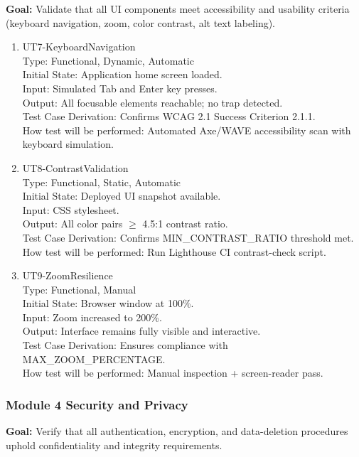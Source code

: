 \documentclass[12pt, titlepage]{article}
\begin{document}
\textbf{Goal:} Validate that all UI components meet accessibility and usability criteria (keyboard navigation, zoom, color contrast, alt text labeling).

\begin{enumerate}
\item{UT7-KeyboardNavigation\\}
Type: Functional, Dynamic, Automatic\\
Initial State: Application home screen loaded.\\
Input: Simulated Tab and Enter key presses.\\
Output: All focusable elements reachable; no trap detected.\\
Test Case Derivation: Confirms WCAG 2.1 Success Criterion 2.1.1.\\
How test will be performed: Automated Axe/WAVE accessibility scan with keyboard simulation.

\item{UT8-ContrastValidation\\}
Type: Functional, Static, Automatic\\
Initial State: Deployed UI snapshot available.\\
Input: CSS stylesheet.\\
Output: All color pairs $\geq$ 4.5:1 contrast ratio.\\
Test Case Derivation: Confirms MIN\_CONTRAST\_RATIO threshold met.\\
How test will be performed: Run Lighthouse CI contrast-check script.

\item{UT9-ZoomResilience\\}
Type: Functional, Manual\\
Initial State: Browser window at 100\%.\\
Input: Zoom increased to 200\%.\\
Output: Interface remains fully visible and interactive.\\
Test Case Derivation: Ensures compliance with MAX\_ZOOM\_PERCENTAGE.\\
How test will be performed: Manual inspection + screen-reader pass.
\end{enumerate}

\subsubsection{Module 4 \textemdash{} Security and Privacy}

\textbf{Goal:} Verify that all authentication, encryption, and data-deletion procedures uphold confidentiality and integrity requirements.
\end{document}
